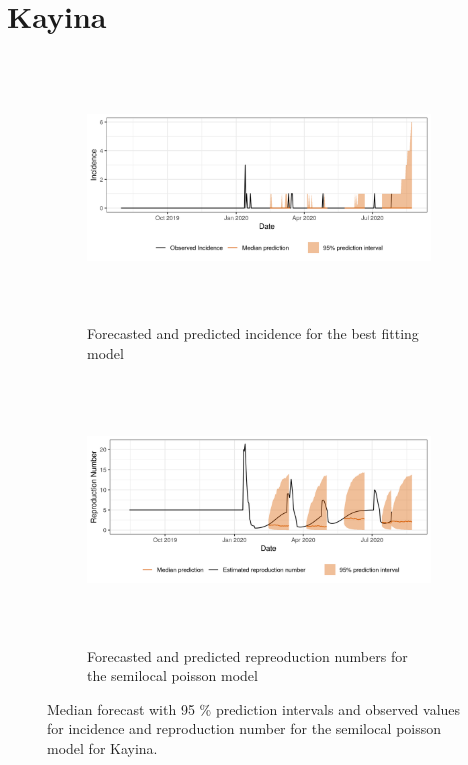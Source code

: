  \section{ Kayina }\begin{figure}[H]\begin{subfigure}{\textwidth}  \centering  \includegraphics[width=0.9\linewidth, height=7cm]{../output/Kayina_predictions.png}  \caption{Forecasted and predicted incidence for the best fitting model}\end{subfigure}

\begin{subfigure}{\textwidth}  \centering  \includegraphics[width=0.9\linewidth, height=7cm]{../output/Kayina_Rs.png}  \caption{Forecasted and predicted repreoduction numbers for the semilocal poisson model}\end{subfigure}  \caption{Median forecast with 95 \% prediction intervals and observed values for incidence and reproduction number for the semilocal poisson model for Kayina.}\end{figure}

